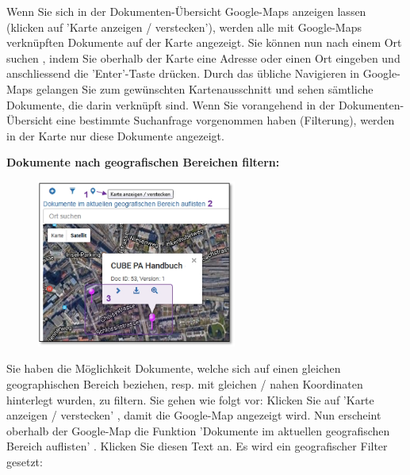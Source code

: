 Wenn Sie sich in der Dokumenten-Übersicht Google-Maps anzeigen lassen (klicken auf 'Karte anzeigen / verstecken'), werden alle mit Google-Maps verknüpften Dokumente auf der Karte angezeigt. Sie können nun nach einem Ort suchen , indem Sie oberhalb der Karte eine Adresse oder einen Ort eingeben und anschliessend die 'Enter'-Taste drücken. Durch das übliche Navigieren in Google-Maps gelangen Sie zum gewünschten Kartenausschnitt und sehen sämtliche Dokumente, die darin verknüpft sind. Wenn Sie vorangehend in der Dokumenten-Übersicht eine bestimmte Suchanfrage vorgenommen haben (Filterung), werden in der Karte nur diese Dokumente angezeigt. \newline

\pagebreak
\textbf{Dokumente nach geografischen Bereichen filtern:}

\vspace{.3cm} 

\begin{figure}
  \vspace{-20pt}
  \begin{center}
    \includegraphics[height=55mm]{../chapters/11_Dokumentenablage/pictures/11-2-3_GeoBereichFilter.jpg}
  \end{center}
  \vspace{-20pt}
  \vspace{-10pt}
\end{figure}
Sie haben die Möglichkeit Dokumente, welche sich auf einen gleichen geographischen Bereich beziehen, resp. mit gleichen / nahen Koordinaten hinterlegt wurden, zu filtern. Sie gehen wie folgt vor: Klicken Sie auf 'Karte anzeigen / verstecken' , damit die Google-Map angezeigt wird. Nun erscheint oberhalb der Google-Map die Funktion 'Dokumente im aktuellen geografischen Bereich auflisten' . Klicken Sie diesen Text an. Es wird ein geografischer Filter gesetzt:

\vspace{.2cm} 

